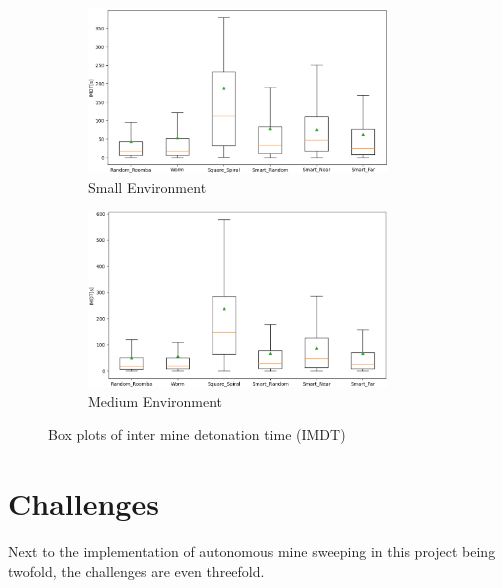 \documentclass[conference]{IEEEtran}
\begin{document}
\begin{figure}[htbp]
     \centering
     \begin{subfigure}[b]{85mm}
         \centering
         \includegraphics[width=79mm]{Analysis_Small_InterMineDetonationTime.png}
         \caption{Small Environment}
         \label{fig:BPMin_Small}
     \end{subfigure}
    
     \begin{subfigure}[b]{85mm}
         \centering
         \includegraphics[width=79mm]{Analysis_Medium_InterMineDetonationTime.png}
         \caption{Medium Environment}
         \label{fig:BPMin_Medium}
     \end{subfigure}
        \caption{Box plots of inter mine detonation time (IMDT)}
        \label{fig:BPMin}
\end{figure}

\section{Challenges \label{sec:Challenges}}

Next to the implementation of autonomous mine sweeping in this project being twofold, the challenges are even threefold.\\
\end{document}
